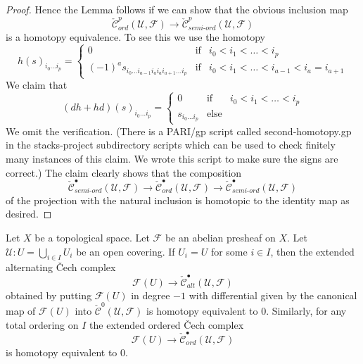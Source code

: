 \begin{proof}
\medskip\noindent
Hence the Lemma follows if we can show that the obvious inclusion map
$$
\check{\mathcal{C}}_{ord}^p(\mathcal{U}, \mathcal{F})
\longrightarrow
\check{\mathcal{C}}_{semi\text{-}ord}^p(\mathcal{U}, \mathcal{F})
$$
is a homotopy equivalence. To see this we use the homotopy
\begin{equation}
\label{equation-second-homotopy}
h(s)_{i_0 \ldots i_p} =
\left\{
\begin{matrix}
0 & \text{if} & i_0 < i_1 < \ldots < i_p \\
(-1)^a s_{i_0 \ldots i_{a - 1} i_a i_a i_{a + 1} \ldots i_p}
& \text{if} & i_0 < i_1 < \ldots < i_{a - 1} < i_a = i_{a + 1}
\end{matrix}
\right.
\end{equation}
We claim that
$$
(dh + hd)(s)_{i_0 \ldots i_p} =
\left\{
\begin{matrix}
0 & \text{if} & i_0 < i_1 < \ldots < i_p \\
s_{i_0 \ldots i_p}
& \text{else} &
\end{matrix}
\right.
$$
We omit the verification. (There is a PARI/gp script called second-homotopy.gp
in the stacks-project subdirectory scripts which can be used to check
finitely many instances of this claim.
We wrote this script to make sure the signs are correct.)
The claim clearly shows that the composition
$$
\check{\mathcal{C}}_{semi\text{-}ord}^\bullet(\mathcal{U}, \mathcal{F})
\longrightarrow
\check{\mathcal{C}}_{ord}^\bullet(\mathcal{U}, \mathcal{F})
\longrightarrow
\check{\mathcal{C}}_{semi\text{-}ord}^\bullet(\mathcal{U}, \mathcal{F})
$$
of the projection with the natural inclusion
is homotopic to the identity map as desired.
\end{proof}

\begin{lemma}
\label{lemma-alternating-cech-trivial}
Let $X$ be a topological space. Let $\mathcal{F}$ be an abelian presheaf on $X$.
Let $\mathcal{U} : U = \bigcup_{i \in I} U_i$ be an open covering. If
$U_i = U$ for some $i \in I$, then the extended alternating {\v C}ech complex
$$
\mathcal{F}(U) \to \check{\mathcal{C}}_{alt}^\bullet(\mathcal{U}, \mathcal{F})
$$
obtained by putting $\mathcal{F}(U)$ in degree $-1$ with differential given by
the canonical map of $\mathcal{F}(U)$ into
$\check{\mathcal{C}}^0(\mathcal{U}, \mathcal{F})$
is homotopy equivalent to $0$. Similarly, for any total ordering on $I$
the extended ordered {\v C}ech complex
$$
\mathcal{F}(U) \to
\check{\mathcal{C}}_{ord}^\bullet(\mathcal{U}, \mathcal{F})
$$
is homotopy equivalent to $0$.
\end{lemma}

